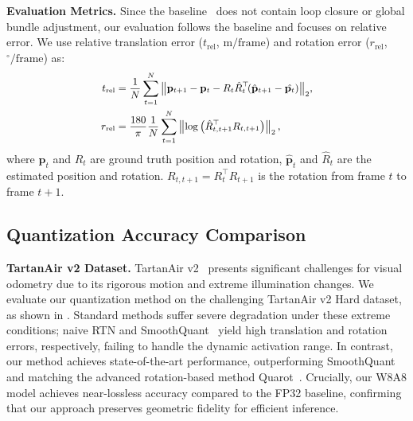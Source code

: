 \textbf{Evaluation Metrics.}\; Since the baseline~\cite{qiu2025mac} does not contain loop closure or global bundle adjustment, our evaluation follows the baseline and focuses on relative error.
We use relative translation error ($t_{\mathrm{rel}}$, $\mathrm{m/frame}$) and rotation error ($r_{\mathrm{rel}}$, $\mathrm{{}^\circ/frame}$) as:
\begin{equation}
\small
\begin{aligned}        
    t_{\mathrm{rel}} &= \frac{1}{N}\sum^N_{t=1}{\left\| \mathbf{p}_{t+1} - \mathbf{p}_{t} - R_{t}\hat{R}_{t}^\top\!\!\left(\hat{\mathbf{p}}_{t+1} - \hat{\mathbf{p}_{t}}\right)\right\|_2},\\
    r_{\mathrm{rel}} &= \frac{180}{\pi}\frac{1}{N} \sum^N_{t=1}\left\| \log\left( \hat{R}_{t,t+1}^\top  R_{t,t+1}\right)\right\|_2, 
\end{aligned}
\end{equation}
where $\mathbf{p}_t$ and $R_t$ are ground truth position and rotation, $\hat{\mathbf{p}}_t$ and $\hat{R}_t$ are the estimated position and rotation. $R_{t,t+1}= R_{t}^\top R_{t+1}$ is the rotation from frame $t$ to frame $t+1$.





\subsection{Quantization Accuracy Comparison}
\label{sec:quant_accuracy}

\textbf{TartanAir v2 Dataset.}\;\;
TartanAir v2~\cite{tartanair} presents significant challenges for visual odometry due to its rigorous motion and extreme illumination changes. We evaluate our quantization method on the challenging TartanAir v2 Hard dataset, as shown in . Standard methods suffer severe degradation under these extreme conditions; naive RTN and SmoothQuant~\cite{xiao2022smoothquant} yield high translation and rotation errors, respectively, failing to handle the dynamic activation range. In contrast, our method achieves state-of-the-art performance, outperforming SmoothQuant and matching the advanced rotation-based method Quarot~\cite{ashkboos2024quarot}. Crucially, our W8A8 model achieves near-lossless accuracy compared to the FP32 baseline, confirming that our approach preserves geometric fidelity for efficient inference.


